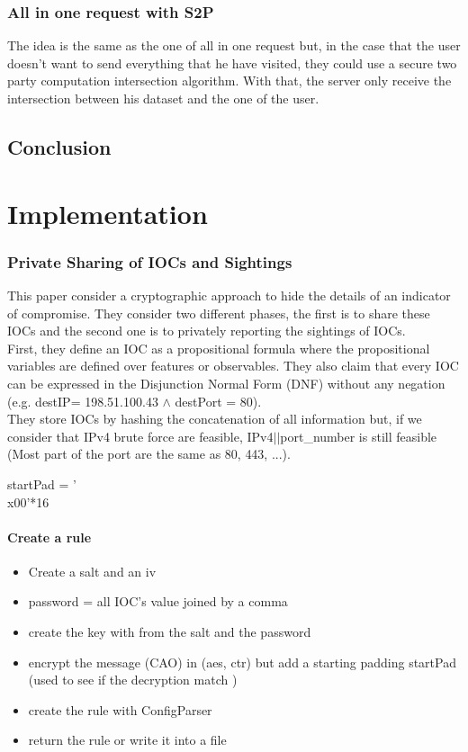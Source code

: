\documentclass{eplmastersthesis}
\begin{document}
\subsection{All in one request with S2P}
The idea is the same as the one of all in one request but, in the case that the user doesn't want to send everything that he have visited, they could use a secure two party computation intersection algorithm.
With that, the server only receive the intersection between his dataset and the one of the user.

\section{Conclusion}

\chapter{Implementation}
\subsection{Private Sharing of IOCs and Sightings \cite{van2016private}}
This paper consider a cryptographic approach to hide the details of an indicator of compromise. They consider two different phases, the first is to share these IOCs and the second one is to privately reporting the sightings of IOCs. \\
First, they define an IOC as a propositional formula where the propositional variables are defined over features or observables. They also claim that every IOC can be expressed in the Disjunction Normal Form (DNF) without any negation (e.g. destIP= 198.51.100.43 $\land$ destPort = 80).\\
They store IOCs by hashing the concatenation of all information but, if we consider that IPv4 brute force are feasible, IPv4$||$port\_number is still feasible (Most part of the port are the same as 80, 443, ...).\\


startPad = '\\x00'*16
\subsubsection{Create a rule}
\begin{itemize}
\item Create a salt and an iv
\item password = all IOC's value joined by a comma
\item create the key with from the salt and the password
\item encrypt the message (CAO) in (aes, ctr) but add a starting padding startPad (used to see if the decryption match )
\item create the rule with ConfigParser 
\item return the rule or write it into a file
\end{itemize}
\end{document}
